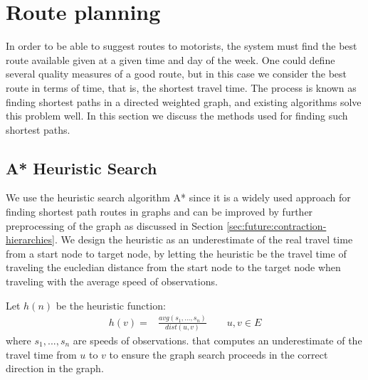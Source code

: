 \section{Route planning}
In order to be able to suggest routes to motorists, the system must find the best route available given at a given time and day of the week. One could define several quality measures of a good route, but in this case we consider the best route in terms of time, that is, the shortest travel time. The process is known as finding shortest paths in a directed weighted graph, and existing algorithms solve this problem well. In this section we discuss the methods used for finding such shortest paths.

\subsection{A* Heuristic Search}\label{sec:pathfinding}
We use the heuristic search algorithm A* since it is a widely used approach for finding shortest path routes in graphs and can be improved by further preprocessing of the graph as discussed in Section \ref{sec:future:contraction-hierarchies}.
We design the heuristic as an underestimate of the real travel time from a start node to target node, by letting the heuristic be the travel time of traveling the eucledian distance from the start node to the target node when traveling with the average speed of observations. 

Let $h(n)$ be the heuristic function:
\begin{align*}
h(v) = &\frac{avg(s_1,…,s_n)}{dist(u,v)} \qquad u,v \in E
\end{align*}
where $s_1,...,s_n$ are speeds of observations.
that computes an underestimate of the travel time from $u$ to $v$ to ensure the graph search proceeds in the correct direction in the graph.

